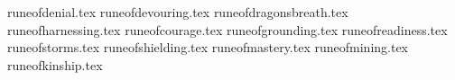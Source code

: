 \onlyinspanish{\newpage}\onlyinenglish{\newpage}
\subtitle{\runicartefacts}

\runicartefactsdef

\raggedcolumns
\begin{multicols}{2}
	\startsortedpricelistNSP
	{runeofdenial.tex}
	{runeofdevouring.tex}
	{runeofdragonsbreath.tex}
	{runeofharnessing.tex}
	{runeofcourage.tex}
	{runeofgrounding.tex}
	{runeofreadiness.tex}
	{runeofstorms.tex}
	{runeofshielding.tex}
	{runeofmastery.tex}
	{runeofmining.tex}
	{runeofkinship.tex}
	\endsortedpricelistNSP
\end{multicols}
